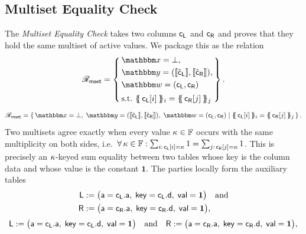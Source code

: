 \subsection{Multiset Equality Check}
The \emph{Multiset Equality Check} takes two columns $\mathsf{c}_{\mathsf{L}}$ and $\mathsf{c}_{\mathsf{R}}$ and proves that they hold the same multiset of active values. We package this as the relation
\ifsp
\begin{displaymath}
\NPRelation_{\mathsf{mset}} = \left\{\,
  \begin{aligned}
    & \NPInstance = \bot,\\
    & \NPInstancey = (\Oracle{\hat{\col}_\Left}, \Oracle{\hat{\col}_\Right}),\\
    & \NPWitness = (\col_\Left, \col_\Right)\\[2pt]
    & \text{s.t.}\ \{\!\!\{\, \col_\Left[i] \,\}\!\!\}_i = \{\!\!\{\, \col_\Right[j] \,\}\!\!\}_j
  \end{aligned}
\,\right\}.
\end{displaymath}
\else
\begin{displaymath}
\NPRelation_{\mathsf{mset}} = \left\{\,
  \NPInstance = \bot,\;
  \NPInstancey = (\Oracle{\hat{\col}_\Left}, \Oracle{\hat{\col}_\Right}),\;
  \NPWitness = (\col_\Left, \col_\Right)
  \;\middle|\;
  \{\!\!\{\, \col_\Left[i] \,\}\!\!\}_i = \{\!\!\{\, \col_\Right[j] \,\}\!\!\}_j
\,\right\}.
\end{displaymath}
\fi
Two multisets agree exactly when every value $\kappa \in \mathbb{F}$ occurs with the same multiplicity on both sides, i.e.\ $\forall\, \kappa \in \mathbb{F} : \sum_{i:\,\mathsf{c}_{\mathsf{L}}[i]=\kappa} 1 = \sum_{j:\,\mathsf{c}_{\mathsf{R}}[j]=\kappa} 1$. This is precisely an $\kappa$-keyed sum equality between two tables whose key is the column data and whose value is the constant $\mathbf{1}$. The parties locally form the auxiliary tables
\ifsp
\begin{align*}
    \mathsf{L} &:= \bigl(\mathsf{a} = \mathsf{c}_{\mathsf{L}}.\mathsf{a},\; \mathsf{key} = \mathsf{c}_{\mathsf{L}}.\mathsf{d},\; \mathsf{val} = \mathbf{1}\bigr)
    \quad\text{and}\\
    \mathsf{R} &:= \bigl(\mathsf{a} = \mathsf{c}_{\mathsf{R}}.\mathsf{a},\; \mathsf{key} = \mathsf{c}_{\mathsf{R}}.\mathsf{d},\; \mathsf{val} = \mathbf{1}\bigr),
\end{align*}
\else
\begin{displaymath}
    \mathsf{L} := \bigl(\mathsf{a} = \mathsf{c}_{\mathsf{L}}.\mathsf{a},\; \mathsf{key} = \mathsf{c}_{\mathsf{L}}.\mathsf{d},\; \mathsf{val} = \mathbf{1}\bigr)
    \quad\text{and}\quad
    \mathsf{R} := \bigl(\mathsf{a} = \mathsf{c}_{\mathsf{R}}.\mathsf{a},\; \mathsf{key} = \mathsf{c}_{\mathsf{R}}.\mathsf{d},\; \mathsf{val} = \mathbf{1}\bigr),
\end{displaymath}

